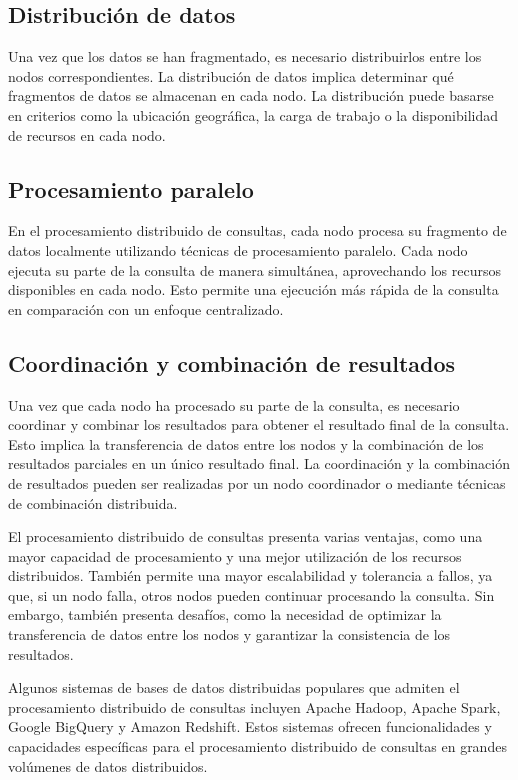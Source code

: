 \subsection{Distribución de datos}
\noindent
Una vez que los datos se han fragmentado, es necesario distribuirlos entre los nodos correspondientes. La distribución de datos implica determinar qué fragmentos de datos se almacenan en cada nodo. La distribución puede basarse en criterios como la ubicación geográfica, la carga de trabajo o la disponibilidad de recursos en cada nodo.

\subsection{Procesamiento paralelo}
\noindent
En el procesamiento distribuido de consultas, cada nodo procesa su fragmento de datos localmente utilizando técnicas de procesamiento paralelo. Cada nodo ejecuta su parte de la consulta de manera simultánea, aprovechando los recursos disponibles en cada nodo. Esto permite una ejecución más rápida de la consulta en comparación con un enfoque centralizado.

\subsection{Coordinación y combinación de resultados}
\noindent
Una vez que cada nodo ha procesado su parte de la consulta, es necesario coordinar y combinar los resultados para obtener el resultado final de la consulta. Esto implica la transferencia de datos entre los nodos y la combinación de los resultados parciales en un único resultado final. La coordinación y la combinación de resultados pueden ser realizadas por un nodo coordinador o mediante técnicas de combinación distribuida.

El procesamiento distribuido de consultas presenta varias ventajas, como una mayor capacidad de procesamiento y una mejor utilización de los recursos distribuidos. También permite una mayor escalabilidad y tolerancia a fallos, ya que, si un nodo falla, otros nodos pueden continuar procesando la consulta. Sin embargo, también presenta desafíos, como la necesidad de optimizar la transferencia de datos entre los nodos y garantizar la consistencia de los resultados.

Algunos sistemas de bases de datos distribuidas populares que admiten el procesamiento distribuido de consultas incluyen Apache Hadoop, Apache Spark, Google BigQuery y Amazon Redshift. Estos sistemas ofrecen funcionalidades y capacidades específicas para el procesamiento distribuido de consultas en grandes volúmenes de datos distribuidos.

